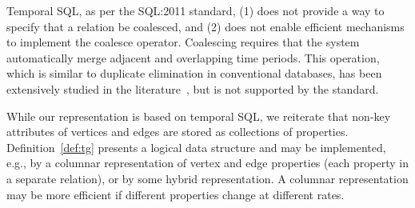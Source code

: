 Temporal SQL, as per the SQL:2011 standard, (1) does not provide a way
to specify that a relation be coalesced, and (2) does not enable
efficient mechanisms to implement the coalesce operator.  Coalescing
requires that the system automatically merge adjacent and overlapping
time periods.  This operation, which is similar to duplicate
elimination in conventional databases, has been extensively studied in
the
literature~\cite{DBLP:conf/vldb/BohlenSS96,DBLP:journals/sigmod/Zimanyi06},
but is not supported by the standard.

While our \ve representation is based on temporal SQL, we reiterate
that non-key attributes of vertices and edges are stored as
collections of properties.  Definition~\ref{def:tg} presents a logical
data structure and may be implemented, e.g., by a columnar
representation of vertex and edge properties (each property in a
separate relation), or by some hybrid representation.  A columnar
representation may be more efficient if different properties change at
different rates.


